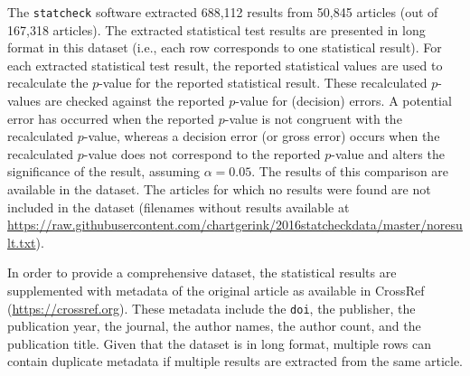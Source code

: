 \documentclass[a5paper]{book}
\begin{document}
\begin{landscape}\begin{table}[t]

\caption{\label{tab:data-1}An overview of the publishers included accompanied by descriptive statistics per publisher regarding the extracted APA results.}
\centering
{}
\end{table}
\end{landscape}

The \texttt{statcheck} software extracted 688,112 results from 50,845
articles (out of 167,318 articles). The extracted statistical test
results are presented in long format in this dataset (i.e., each row
corresponds to one statistical result). For each extracted statistical
test result, the reported statistical values are used to recalculate the
\(p\)-value for the reported statistical result. These recalculated
\(p\)-values are checked against the reported \(p\)-value for (decision)
errors. A potential error has occurred when the reported \(p\)-value is
not congruent with the recalculated \(p\)-value, whereas a decision
error (or gross error) occurs when the recalculated \(p\)-value does not
correspond to the reported \(p\)-value and alters the significance of
the result, assuming \(\alpha=0.05\). The results of this comparison are
available in the dataset. The articles for which no results were found
are not included in the dataset (filenames without results available at
\url{https://raw.githubusercontent.com/chartgerink/2016statcheckdata/master/noresult.txt}).

In order to provide a comprehensive dataset, the statistical results are
supplemented with metadata of the original article as available in
CrossRef (\url{https://crossref.org}). These metadata include the
\texttt{doi}, the publisher, the publication year, the journal, the
author names, the author count, and the publication title. Given that
the dataset is in long format, multiple rows can contain duplicate
metadata if multiple results are extracted from the same article.
\end{document}
